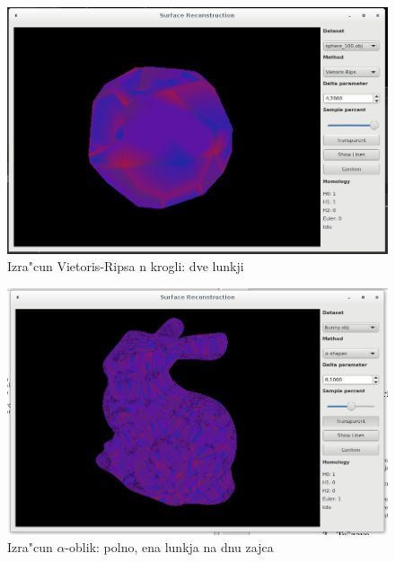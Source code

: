 \documentclass[11pt]{article}
\begin{document}
\begin{figure}[htb]
    \centering
    \includegraphics[width=1\textwidth]{vr_2hole.png}
    \caption{Izra"cun Vietoris-Ripsa n krogli: dve lunkji}
    \label{fig:vr4}
\end{figure}

\begin{figure}[htb]
    \centering
    \includegraphics[width=1\textwidth]{alpha_full.png}
    \caption{Izra"cun $\alpha$-oblik: polno, ena lunkja na dnu zajca}
    \label{fig:a1}
\end{figure}
\end{document}
